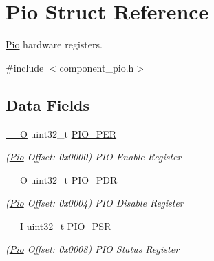 \hypertarget{structPio}{}\section{Pio Struct Reference}
\label{structPio}


\mbox{\hyperlink{structPio}{Pio}} hardware registers.  




{\ttfamily \#include $<$component\+\_\+pio.\+h$>$}

\subsection*{Data Fields}
\begin{DoxyCompactItemize}
\item 
\mbox{\label{structPio_aa2303c26dd07726330d3e4c558a108b2}} 
\mbox{\hyperlink{core__cm7_8h_a7e25d9380f9ef903923964322e71f2f6}{\+\_\+\+\_\+O}} uint32\+\_\+t \mbox{\hyperlink{structPio_aa2303c26dd07726330d3e4c558a108b2}{P\+I\+O\+\_\+\+P\+ER}}
\begin{DoxyCompactList}\small\item\em (\mbox{\hyperlink{structPio}{Pio}} Offset\+: 0x0000) P\+IO Enable Register \end{DoxyCompactList}\item 
\mbox{\label{structPio_a8c8414f679e47037c74c912052c6fc13}} 
\mbox{\hyperlink{core__cm7_8h_a7e25d9380f9ef903923964322e71f2f6}{\+\_\+\+\_\+O}} uint32\+\_\+t \mbox{\hyperlink{structPio_a8c8414f679e47037c74c912052c6fc13}{P\+I\+O\+\_\+\+P\+DR}}
\begin{DoxyCompactList}\small\item\em (\mbox{\hyperlink{structPio}{Pio}} Offset\+: 0x0004) P\+IO Disable Register \end{DoxyCompactList}\item 
\mbox{\label{structPio_ae8d86ba536dc428e4b1cb59f6631312a}} 
\mbox{\hyperlink{core__cm7_8h_af63697ed9952cc71e1225efe205f6cd3}{\+\_\+\+\_\+I}} uint32\+\_\+t \mbox{\hyperlink{structPio_ae8d86ba536dc428e4b1cb59f6631312a}{P\+I\+O\+\_\+\+P\+SR}}
\begin{DoxyCompactList}\small\item\em (\mbox{\hyperlink{structPio}{Pio}} Offset\+: 0x0008) P\+IO Status Register \end{DoxyCompactList}\item 

\end{DoxyCompactItemize}
